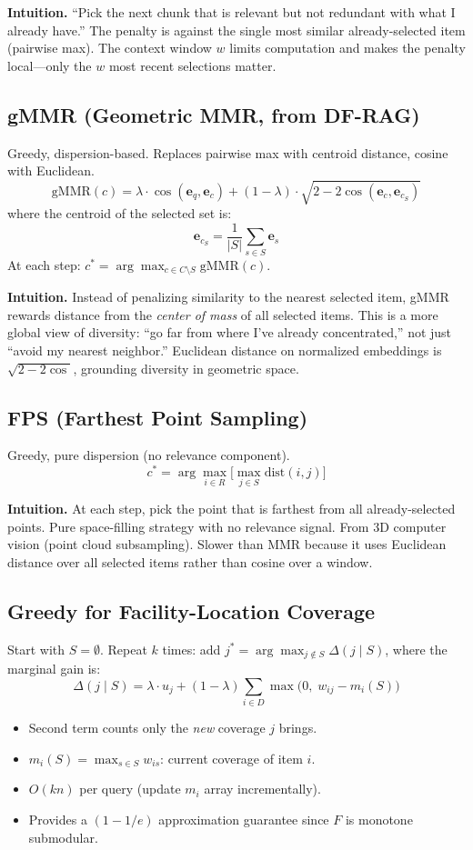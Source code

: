 \documentclass[11pt,a4paper]{article}
\begin{document}
\textbf{Intuition.} ``Pick the next chunk that is relevant but not redundant with what I already have.'' The penalty is against the single most similar already-selected item (pairwise max). The context window $w$ limits computation and makes the penalty local---only the $w$ most recent selections matter.

\subsection{gMMR (Geometric MMR, from DF-RAG)}

Greedy, dispersion-based. Replaces pairwise max with centroid distance, cosine with Euclidean.
\[
	\mathrm{gMMR}(c) = \lambda \cdot \cos(\mathbf{e}_q, \mathbf{e}_c) + (1-\lambda) \cdot \sqrt{2 - 2\cos(\mathbf{e}_c, \mathbf{e}_{c_S})}
\]
where the centroid of the selected set is:
\[
	\mathbf{e}_{c_S} = \frac{1}{|S|} \sum_{s \in S} \mathbf{e}_s
\]
At each step: $c^* = \arg\max_{c \in C \setminus S} \mathrm{gMMR}(c)$.

\textbf{Intuition.} Instead of penalizing similarity to the nearest selected item, gMMR rewards distance from the \emph{center of mass} of all selected items. This is a more global view of diversity: ``go far from where I've already concentrated,'' not just ``avoid my nearest neighbor.'' Euclidean distance on normalized embeddings is $\sqrt{2 - 2\cos}$, grounding diversity in geometric space.

\subsection{FPS (Farthest Point Sampling)}

Greedy, pure dispersion (no relevance component).
\[
	c^* = \arg\max_{i \in R} \Big[ \max_{j \in S} \mathrm{dist}(i, j) \Big]
\]

\textbf{Intuition.} At each step, pick the point that is farthest from all already-selected points. Pure space-filling strategy with no relevance signal. From 3D computer vision (point cloud subsampling). Slower than MMR because it uses Euclidean distance over all selected items rather than cosine over a window.

\subsection{Greedy for Facility-Location Coverage}

Start with $S = \emptyset$. Repeat $k$ times: add $j^* = \arg\max_{j \notin S} \Delta(j \mid S)$, where the marginal gain is:
\[
	\Delta(j \mid S) = \lambda \cdot u_j + (1-\lambda) \sum_{i \in D} \max\big(0,\; w_{ij} - m_i(S)\big)
\]
\begin{itemize}
	\item Second term counts only the \emph{new} coverage $j$ brings.
	\item $m_i(S) = \max_{s \in S} w_{is}$: current coverage of item $i$.
	\item $O(kn)$ per query (update $m_i$ array incrementally).
	\item Provides a $(1-1/e)$ approximation guarantee since $F$ is monotone submodular.
\end{itemize}
\end{document}
